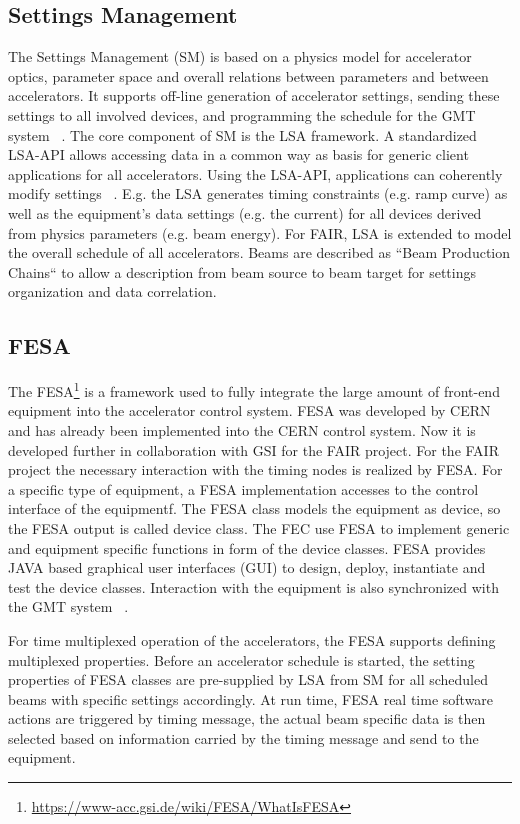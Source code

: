 \subsection{Settings Management}
The Settings Management (\gls{SM}) is based on a physics model for accelerator optics, parameter space and overall relations between parameters and between accelerators. It supports off-line generation of accelerator settings, sending these settings to all involved devices, and programming the schedule for the GMT system ~\cite{huhmann_fair_2013}. The core component of SM is the LSA framework. A standardized  LSA-\gls{API} allows accessing data in a common way as basis for generic client applications for all accelerators. Using the LSA-API, applications can coherently modify settings ~\cite{huhmann_fair_2013}. E.g. the LSA generates timing constraints (e.g. ramp curve) as well as the equipment's data settings (e.g. the current) for all devices derived from physics parameters (e.g. beam energy). For FAIR, LSA is extended to model the overall schedule of all accelerators. Beams are described as ``Beam Production Chains`` to allow a description from beam source to beam target for settings organization and data correlation.


\subsection{FESA}
The \gls{FESA}\footnote{\url{https://www-acc.gsi.de/wiki/FESA/WhatIsFESA}} is a framework used to fully integrate the large amount of front-end equipment into the accelerator control system. FESA was developed by CERN and has already been implemented into the \gls{CERN} control system. Now it is developed further in collaboration with GSI for the FAIR project. For the FAIR project the necessary interaction with the timing nodes is realized by FESA. For a specific type of equipment, a FESA implementation accesses to the control interface of the equipmentf. The FESA class models the equipment as device, so the FESA output is called device class. The \gls{FEC} use FESA to implement generic and equipment specific functions in form of the device classes. FESA provides JAVA based graphical user interfaces (GUI) to design, deploy, instantiate and test the device classes. Interaction with the equipment is also synchronized with the GMT system ~\cite{hoffmann_fesafront-end_2008}. 

For time multiplexed operation of the accelerators, the FESA supports defining multiplexed properties. Before an accelerator schedule is started, the setting properties of FESA classes are pre-supplied by LSA from SM for all scheduled beams with specific settings accordingly. At run time, FESA real time software actions are triggered by timing message, the actual beam specific data is then selected based on information carried by the timing message and send to the equipment. 

